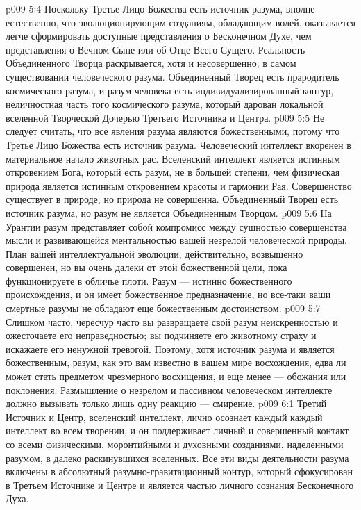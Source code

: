\vs p009 5:4 \pc Поскольку Третье Лицо Божества есть источник разума, вполне естественно, что эволюционирующим созданиям, обладающим волей, оказывается легче сформировать доступные представления о Бесконечном Духе, чем представления о Вечном Сыне или об Отце Всего Сущего. Реальность Объединенного Творца раскрывается, хотя и несовершенно, в самом существовании человеческого разума. Объединенный Творец есть прародитель космического разума, и разум человека есть индивидуализированный контур, неличностная часть того космического разума, который дарован локальной вселенной Творческой Дочерью Третьего Источника и Центра.
\vs p009 5:5 \pc Не следует считать, что все явления разума являются божественными, потому что Третье Лицо Божества есть источник разума. Человеческий интеллект вкоренен в материальное начало животных рас. Вселенский интеллект является истинным откровением Бога, который есть разум, не в большей степени, чем физическая природа является истинным откровением красоты и гармонии Рая. Совершенство существует в природе, но природа не совершенна. Объединенный Творец есть источник разума, но разум не является Объединенным Творцом.
\vs p009 5:6 На Урантии разум представляет собой компромисс между сущностью совершенства мысли и развивающейся ментальностью вашей незрелой человеческой природы. План вашей интеллектуальной эволюции, действительно, возвышенно совершенен, но вы очень далеки от этой божественной цели, пока функционируете в обличье плоти. Разум --- истинно божественного происхождения, и он имеет божественное предназначение, но все\hyp{}таки ваши смертные разумы не обладают еще божественным достоинством.
\vs p009 5:7 Слишком часто, чересчур часто вы развращаете свой разум неискренностью и ожесточаете его неправедностью; вы подчиняете его животному страху и искажаете его ненужной тревогой. Поэтому, хотя источник разума и является божественным, разум, как это вам известно в вашем мире восхождения, едва ли может стать предметом чрезмерного восхищения, и еще менее --- обожания или поклонения. Размышление о незрелом и пассивном человеческом интеллекте должно вызывать только лишь одну реакцию --- смирение.
\vs p009 6:1 Третий Источник и Центр, вселенский интеллект, лично осознает каждый  каждый интеллект во всем творении, и он поддерживает личный и совершенный контакт со всеми физическими, моронтийными и духовными созданиями, наделенными разумом, в далеко раскинувшихся вселенных. Все эти виды деятельности разума включены в абсолютный разумно\hyp{}гравитационный контур, который сфокусирован в Третьем Источнике и Центре и является частью личного сознания Бесконечного Духа.
